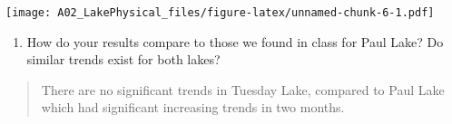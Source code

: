 \documentclass[]{article}
\providecommand{\tightlist}{%
  \setlength{\itemsep}{0pt}\setlength{\parskip}{0pt}}
\begin{document}
\texttt{[image: A02\_LakePhysical\_files/figure-latex/unnamed-chunk-6-1.pdf]}

\begin{enumerate}
\def\labelenumi{\arabic{enumi}.}
\setcounter{enumi}{11}
\tightlist
\item
  How do your results compare to those we found in class for Paul Lake?
  Do similar trends exist for both lakes?
\end{enumerate}

\begin{quote}
There are no significant trends in Tuesday Lake, compared to Paul Lake
which had significant increasing trends in two months.
\end{quote}
\end{document}
